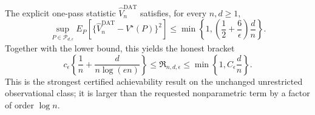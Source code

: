 The explicit one-pass statistic \(\widehat V_n^{\mathrm{DAT}}\) satisfies, for every \(n,d\ge1\),
\[
 \sup_{P\in\mathcal P_{d,\epsilon}}
 E_P\!\left[\{\widehat V_n^{\mathrm{DAT}}-V^\star(P)\}^2\right]
 \le \min\!\left\{1,\left(\frac12+\frac6\epsilon\right)\frac dn\right\}.
\]
Together with the lower bound, this yields the honest bracket
\[
 c_\epsilon\left\{\frac1n+\frac d{n\log(en)}\right\}
 \le\mathfrak R_{n,d,\epsilon}
 \le\min\!\left\{1,C_\epsilon\frac dn\right\}.
\]
This is the strongest certified achievability result on the unchanged unrestricted observational class; it is larger than the requested nonparametric term by a factor of order \(\log n\).